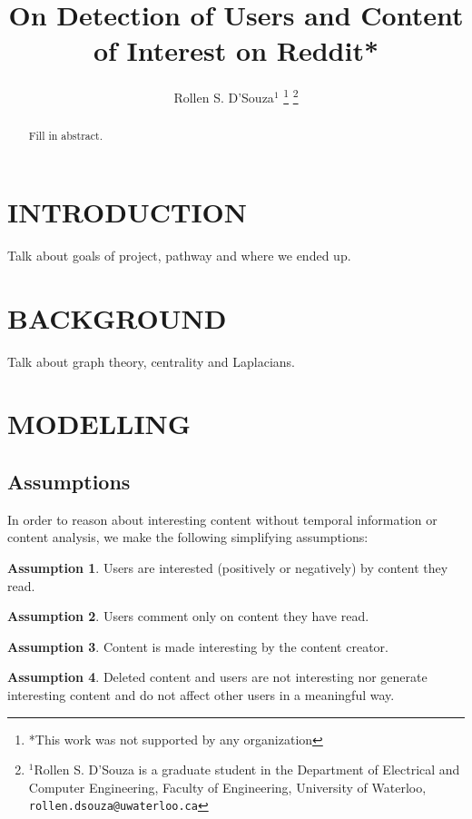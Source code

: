 \documentclass[letterpaper, 10 pt, conference]{ieeeconf}
\title{\LARGE \bf
On Detection of Users and Content of Interest on Reddit*
}
\author{Rollen S. D'Souza$^{1}$%
  \thanks{*This work was not supported by any organization}%
  \thanks{$^{1}$Rollen S. D'Souza is a graduate student in the
    Department of Electrical and Computer Engineering,
    Faculty of Engineering,
    University of Waterloo,
    \texttt{rollen.dsouza@uwaterloo.ca}
  }%
}
\theoremstyle{definition}
\newtheorem{assumption}{Assumption}[section]
\newcommand{\red}{\color{red}}
\begin{document}
\maketitle
\thispagestyle{empty}
\pagestyle{empty}


\begin{abstract}
Fill in abstract.
\end{abstract}


\section{INTRODUCTION}
{\red Talk about goals of project, pathway and where we ended up.}

\section{BACKGROUND}
{\red Talk about graph theory, centrality and Laplacians.}

\section{MODELLING}

\subsection{Assumptions}
In order to reason about interesting content without temporal information or content analysis, we make the following simplifying assumptions:

\begin{assumption}
  Users are interested (positively or negatively) by content they read.
  \label{assume:1}
\end{assumption} 

\begin{assumption}
  Users comment only on content they have read.
  \label{assume:2}
\end{assumption}

\begin{assumption}
  Content is made interesting by the content creator.
  \label{assume:3}
\end{assumption}

\begin{assumption}
  Deleted content and users are not interesting nor generate interesting content and do not affect other users in a meaningful way.
  \label{assume:4}
\end{assumption}
\end{document}
